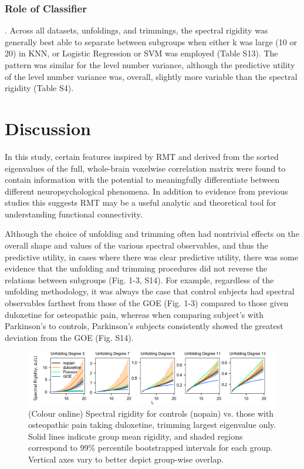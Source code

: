 \documentclass[10pt]{article}
\begin{document}
\subsubsection{Role of Classifier}. Across all datasets, unfoldings, and trimmings, the spectral rigidity was
generally best able to separate between subgroups when either k was large (10 or 20) in KNN, or
Logistic Regression or SVM was employed (Table S13). The pattern was similar for the level number
variance, although the predictive utility of the level number variance was, overall, slightly more
variable than the spectral rigidity (Table S4).

\section{Discussion}
In this study, certain features inspired by RMT and derived from the sorted eigenvalues of the full,
whole-brain voxelwise correlation matrix were found to contain information with the potential to
meaningfully differentiate between different neuropsychological phenomena. In addition to evidence
from previous studies
\citep{sebaRandomMatrixAnalysis2003,wangRandomMatrixTheory2016,matharooSpontaneousBackpainAlters2020}
this suggests RMT may be a useful analytic and theoretical tool for understanding functional
connectivity.

Although the choice of unfolding and trimming often had nontrivial effects on the overall shape and
values of the various spectral observables, and thus the predictive utility, in cases where there
was clear predictive utility, there was some evidence that the unfolding and trimming procedures did
not reverse the relations between subgroups (Fig. 1-3, S14). For example, regardless of the
unfolding methodology, it was always the case that control subjects had spectral observables
farthest from those of the GOE (Fig. 1-3) compared to those given duloxetine for osteopathic pain,
whereas when comparing subject's with Parkinson's to controls, Parkinson's subjects consistently
showed the greatest deviation from the GOE (Fig. S14).

\begin{figure}[ht]
\centerline{\includegraphics[width=\textwidth]{figure1}} \caption{
    (Colour online) Spectral rigidity for controls (nopain) vs. those with osteopathic pain taking
    duloxetine, trimming largest eigenvalue only. Solid lines indicate group mean rigidity, and
    shaded regions correspond to 99\% percentile bootstrapped intervals for each group. Vertical
    axes vary to better depict group-wise overlap.}
\label{fig:rigidity}
\end{figure}
\end{document}
